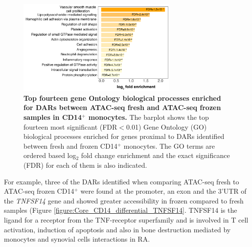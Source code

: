 \begin{figure}[htbp]
\centering
\includegraphics[width=0.7\textwidth]{./Results1/pdfs/ATAC_core_CD14_fresh_vs_frozen_GOBP_barplot}
\caption[Top fourteen Gene Ontology biological processes enriched for DARs between ATAC-seq fresh and ATAC-seq frozen samples in CD14$^+$ monocytes.]{\textbf{Top fourteen gene Ontology biological processes enriched for DARs between ATAC-seq fresh and ATAC-seq frozen samples in CD14$^+$ monocytes.} The barplot shows the top fourteen most significant (FDR$<$0.01) Gene Ontology (GO) biological processes enriched for genes proximal to DARs identified between fresh and frozen CD14$^+$ monocytes.  The GO terms are ordered based log$_2$ fold change enrichment and the exact significance (FDR) for each of them is also indicated.}
\label{figure:Core_CD14_fresh_vs_frozen_GOBP_barplot}
\end{figure}


	
For example, three of the DARs identified when comparing ATAC-seq fresh to ATAC-seq frozen CD14$^+$ were found at the promoter, an exon and the 3'UTR of the \textit{TNFSF14} gene and showed greater accessibility in frozen compared to fresh samples (Figure \ref{figure:Core_CD14_differential_TNFSF14}. TNFSF14 is the ligand for a receptor from the TNF-receptor superfamily and is involved in T cell activation, induction of apoptosis and  also in bone destruction mediated by monocytes and synovial cells interactions in RA. 

	
	
